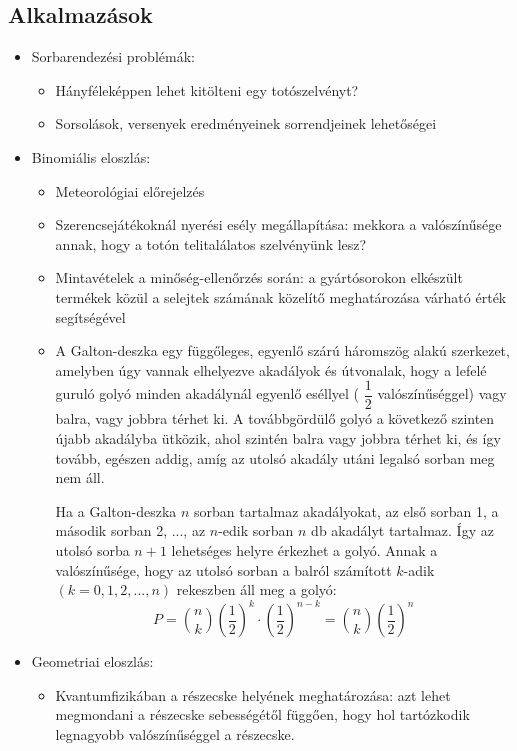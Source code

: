 \documentclass[12pt,a4paper]{article}
\begin{document}
\subsection{Alkalmazások}
\begin{itemize}
\item Sorbarendezési problémák:
\begin{itemize}
\item Hányféleképpen lehet kitölteni egy totószelvényt?
\item Sorsolások, versenyek eredményeinek sorrendjeinek lehetőségei
\end{itemize}
\item Binomiális eloszlás:
\begin{itemize}
\item Meteorológiai előrejelzés
\item Szerencsejátékoknál nyerési esély megállapítása: mekkora a valószínűsége annak, hogy a totón telitalálatos szelvényünk lesz?
\item Mintavételek a minőség-ellenőrzés során: a gyártósorokon elkészült termékek közül a selejtek számának közelítő meghatározása várható érték segítségével
\item  A Galton-deszka egy függőleges, egyenlő szárú háromszög alakú szerkezet, amelyben úgy vannak elhelyezve akadályok és útvonalak, hogy a lefelé guruló golyó minden akadálynál egyenlő eséllyel ( $\dfrac{1}{2}$ valószínűséggel) vagy balra, vagy jobbra térhet ki. A továbbgördülő golyó a következő szinten újabb akadályba ütközik, ahol szintén balra vagy jobbra térhet ki, és így tovább, egészen addig, amíg az utolsó akadály utáni legalsó sorban meg nem áll.

Ha a Galton-deszka $n$ sorban tartalmaz akadályokat, az első sorban 1, a második sorban 2, ..., az $n$-edik sorban $n$ db akadályt tartalmaz. Így az utolsó sorba $n + 1$ lehetséges helyre érkezhet a golyó. Annak a valószínűsége, hogy az utolsó sorban a balról számított $k$-adik $(k = 0, 1, 2, ..., n)$ rekeszben áll meg a golyó: $$P=\displaystyle\binom{n}{k}\left(\dfrac{1}{2} \right)^k\cdot \left(\dfrac{1}{2} \right)^{n-k}=\displaystyle\binom{n}{k}\left(\dfrac{1}{2} \right)^n$$
\end{itemize}
\item Geometriai eloszlás:
\begin{itemize}
\item Kvantumfizikában a részecske helyének meghatározása: azt lehet megmondani a részecske sebességétől függően, hogy hol tartózkodik legnagyobb valószínűséggel a részecske.
\end{itemize}
\end{itemize}
\end{document}
